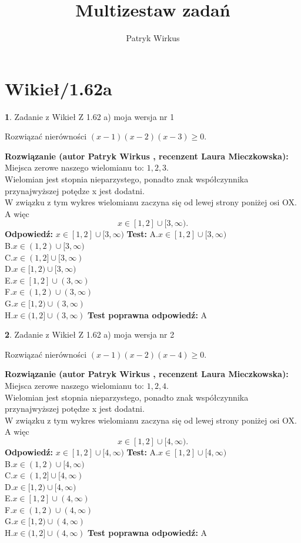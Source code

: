 \documentclass[12pt, a4paper]{article}
\title{Multizestaw zadań}
\author{Patryk Wirkus}
\date{}
\theoremstyle{definition} %
\newtheorem{zad}{}
\newcommand{\kategoria}[1]{\section{#1}}
\newcommand{\zadStart}[1]{\begin{zad}#1\newline}
\newcommand{\zadStop}{\end{zad}}
\newcommand{\rozwStart}[2]{\noindent \textbf{Rozwiązanie (autor #1 , recenzent #2): }\newline}
\newcommand{\rozwStop}{\newline}
\newcommand{\odpStart}{\noindent \textbf{Odpowiedź:}\newline}
\newcommand{\odpStop}{\newline}
\newcommand{\testStart}{\noindent \textbf{Test:}\newline}
\newcommand{\testStop}{\newline}
\newcommand{\kluczStart}{\noindent \textbf{Test poprawna odpowiedź:}\newline}
\newcommand{\kluczStop}{\newline}
\begin{document}
\maketitle

\kategoria{Wikieł/1.62a}


\zadStart{Zadanie z Wikieł Z 1.62 a) moja wersja nr 1}

Rozwiązać nierówności $(x-1)(x-2)(x-3)\ge0$.
\zadStop
\rozwStart{Patryk Wirkus}{Laura Mieczkowska}
Miejsca zerowe naszego wielomianu to: $1, 2, 3$.\\
Wielomian jest stopnia nieparzystego, ponadto znak współczynnika przy\linebreak najwyższej potędze x jest dodatni.\\ W związku z tym wykres wielomianu zaczyna się od lewej strony poniżej osi OX. A więc $$x \in [1,2] \cup [3,\infty).$$
\rozwStop
\odpStart
$x \in [1,2] \cup [3,\infty)$
\odpStop
\testStart
A.$x \in [1,2] \cup [3,\infty)$\\
B.$x \in (1,2) \cup [3,\infty)$\\
C.$x \in (1,2] \cup [3,\infty)$\\
D.$x \in [1,2) \cup [3,\infty)$\\
E.$x \in [1,2] \cup (3,\infty)$\\
F.$x \in (1,2) \cup (3,\infty)$\\
G.$x \in [1,2) \cup (3,\infty)$\\
H.$x \in (1,2] \cup (3,\infty)$
\testStop
\kluczStart
A
\kluczStop



\zadStart{Zadanie z Wikieł Z 1.62 a) moja wersja nr 2}

Rozwiązać nierówności $(x-1)(x-2)(x-4)\ge0$.
\zadStop
\rozwStart{Patryk Wirkus}{Laura Mieczkowska}
Miejsca zerowe naszego wielomianu to: $1, 2, 4$.\\
Wielomian jest stopnia nieparzystego, ponadto znak współczynnika przy\linebreak najwyższej potędze x jest dodatni.\\ W związku z tym wykres wielomianu zaczyna się od lewej strony poniżej osi OX. A więc $$x \in [1,2] \cup [4,\infty).$$
\rozwStop
\odpStart
$x \in [1,2] \cup [4,\infty)$
\odpStop
\testStart
A.$x \in [1,2] \cup [4,\infty)$\\
B.$x \in (1,2) \cup [4,\infty)$\\
C.$x \in (1,2] \cup [4,\infty)$\\
D.$x \in [1,2) \cup [4,\infty)$\\
E.$x \in [1,2] \cup (4,\infty)$\\
F.$x \in (1,2) \cup (4,\infty)$\\
G.$x \in [1,2) \cup (4,\infty)$\\
H.$x \in (1,2] \cup (4,\infty)$
\testStop
\kluczStart
A
\kluczStop
\end{document}
